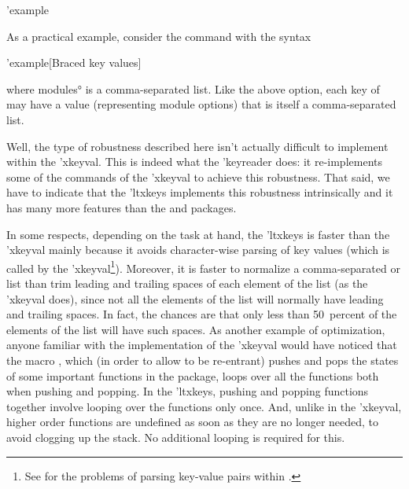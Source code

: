 \documentclass[
  use-a4-paper,
  use-10pt-font,
  final-version,
  use-UK-English,
  fancy-section-headings,
  frame-section-numbers,
  para-abstract-style,
  inputfile,
  input-config-file,
  no-hyperref-messages,
  wrapquote,
]{amltxdoc}
\begin{document}
\start'{example}

As a practical example, consider the command \fx{\loadModules} with the syntax

\start'{example}[Braced key values]

where \ang{modules} is a comma-separated \keyval list. Like the above  option, each key of \fx{\loadModules} may have a value (representing module options) that is itself a comma-separated \keyval list.

Well, the type of robustness described here isn't actually difficult to implement within the \pkg'{xkeyval}. This is indeed what the \pkg'{keyreader} does: it re-implements some of the commands of the \pkg'{xkeyval} to achieve this robustness. That said, we have to indicate that the \pkg'{ltxkeys} implements this robustness intrinsically and it has many more features than the  and  packages.

In some respects, depending on the task at hand, the \pkg'{ltxkeys} is faster than the \pkg'{xkeyval} mainly because it avoids character-wise parsing of key values (which is called  by the \pkg'{xkeyval}\footnote{See  for the problems of parsing key-value pairs within .}). Moreover, it is faster to normalize a comma-separated or \keyval list than trim leading and trailing spaces of each element of the list (as the  \pkg'{xkeyval} does), since not all the elements of the list will normally have leading and trailing spaces. In fact, the chances are that only less than 50~percent of the elements of the list will have such spaces. As another example of optimization, anyone familiar with the implementation of the \pkg'{xkeyval} would have noticed that the macro \hx{\XKV@srstate}, which (in order to allow \hx{\setkeys} to be re-entrant) pushes and pops the states of some important functions in the package, loops over all the functions both when pushing and popping. In the \pkg'{ltxkeys}, pushing and popping functions together involve looping over the functions only once. And, unlike in the \pkg'{xkeyval}, higher order functions are undefined as soon as they are no longer needed, to avoid clogging up the stack. No additional looping is required for this.
\end{document}
